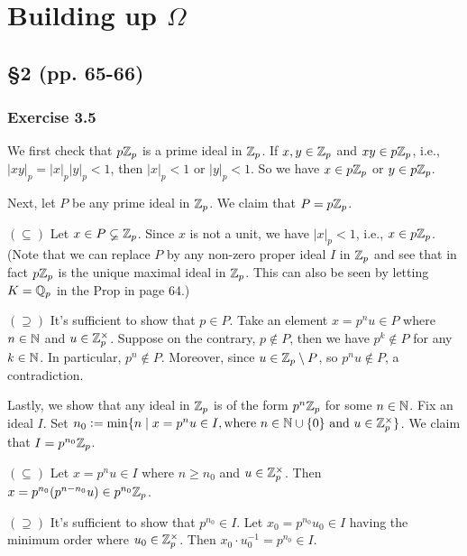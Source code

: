 \documentclass[../Koblitz.tex]{subfiles}
\begin{document}
\chapter{Building up \texorpdfstring{$\Omega$}{Omega}}

\section*{\S2 (pp. 65-66)}

\subsection*{Exercise 3.5}

We first check that $p\mathbb{Z}_p$ is a prime ideal in $\mathbb{Z}_p$. If $x,y\in\mathbb{Z}_p$ and $xy\in p\mathbb{Z}_p$, i.e., $|xy|_p=|x|_p|y|_p<1$, then $|x|_p<1$ or $|y|_p<1$. So we have $x\in p\mathbb{Z}_p$ or $y\in p\mathbb{Z}_p$.

Next, let $P$ be any prime ideal in $\mathbb{Z}_p$. We claim that $P=p\mathbb{Z}_p$. 

$(\subseteq)$ Let $x\in P\varsubsetneq\mathbb{Z}_p$. Since $x$ is not a unit, we have $|x|_p<1$, i.e., $x\in p\mathbb{Z}_p$. (Note that we can replace $P$ by any non-zero proper ideal $I$ in $\mathbb{Z}_p$ and see that in fact $p\mathbb{Z}_p$ is the unique maximal ideal in $\mathbb{Z}_p$. This can also be seen by letting $K=\mathbb{Q}_p$ in the Prop in page 64.)

$(\supseteq)$ It's sufficient to show that $p\in P$. Take an element $x=p^nu\in P$ where $n\in\mathbb{N}$ and $u\in\mathbb{Z}_p^\times$. Suppose on the contrary, $p\not\in P$, then we have $p^k\not\in P$ for any $k\in\mathbb{N}$. In particular, $p^n\not\in P$. Moreover, since $u\in\mathbb{Z}_p\setminus P$, so $p^nu\not\in P$, a contradiction.

Lastly, we show that any ideal in $\mathbb{Z}_p$ is of the form $p^n\mathbb{Z}_p$ for some $n\in\mathbb{N}$. Fix an ideal $I$. Set $n_0:=\min \{n\mid x=p^nu\in I, \text{where }n\in\mathbb{N}\cup\{0\} \text{ and } u\in\mathbb{Z}_p^\times\}$. We claim that $I=p^{n_0}\mathbb{Z}_p$.

$(\subseteq)$ Let $x=p^nu\in I$ where $n\geq n_0$ and $u\in\mathbb{Z}_p^\times$. Then $x=p^{n_0}(p^{n-n_0}u)\in p^{n_0}\mathbb{Z}_p$.

$(\supseteq)$ It's sufficient to show that $p^{n_0}\in I$. Let $x_0=p^{n_0}u_0\in I$ having the minimum order where $u_0\in\mathbb{Z}_p^\times$. Then $x_0\cdot u_0^{-1}=p^{n_0}\in I$.
\end{document}
